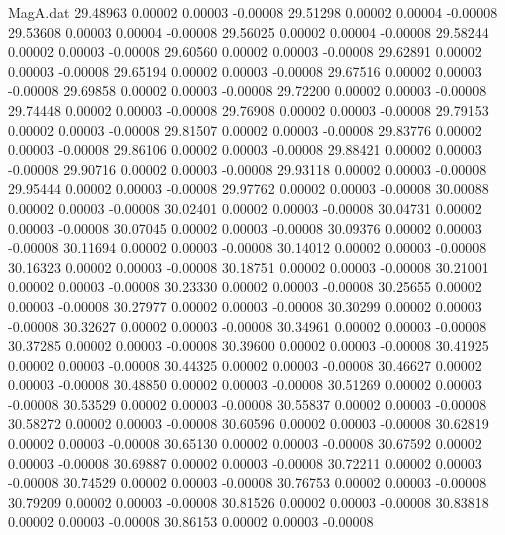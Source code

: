 \begin{filecontents}{MagA.dat}
  29.48963    0.00002    0.00003   -0.00008
  29.51298    0.00002    0.00004   -0.00008
  29.53608    0.00003    0.00004   -0.00008
  29.56025    0.00002    0.00004   -0.00008
  29.58244    0.00002    0.00003   -0.00008
  29.60560    0.00002    0.00003   -0.00008
  29.62891    0.00002    0.00003   -0.00008
  29.65194    0.00002    0.00003   -0.00008
  29.67516    0.00002    0.00003   -0.00008
  29.69858    0.00002    0.00003   -0.00008
  29.72200    0.00002    0.00003   -0.00008
  29.74448    0.00002    0.00003   -0.00008
  29.76908    0.00002    0.00003   -0.00008
  29.79153    0.00002    0.00003   -0.00008
  29.81507    0.00002    0.00003   -0.00008
  29.83776    0.00002    0.00003   -0.00008
  29.86106    0.00002    0.00003   -0.00008
  29.88421    0.00002    0.00003   -0.00008
  29.90716    0.00002    0.00003   -0.00008
  29.93118    0.00002    0.00003   -0.00008
  29.95444    0.00002    0.00003   -0.00008
  29.97762    0.00002    0.00003   -0.00008
  30.00088    0.00002    0.00003   -0.00008
  30.02401    0.00002    0.00003   -0.00008
  30.04731    0.00002    0.00003   -0.00008
  30.07045    0.00002    0.00003   -0.00008
  30.09376    0.00002    0.00003   -0.00008
  30.11694    0.00002    0.00003   -0.00008
  30.14012    0.00002    0.00003   -0.00008
  30.16323    0.00002    0.00003   -0.00008
  30.18751    0.00002    0.00003   -0.00008
  30.21001    0.00002    0.00003   -0.00008
  30.23330    0.00002    0.00003   -0.00008
  30.25655    0.00002    0.00003   -0.00008
  30.27977    0.00002    0.00003   -0.00008
  30.30299    0.00002    0.00003   -0.00008
  30.32627    0.00002    0.00003   -0.00008
  30.34961    0.00002    0.00003   -0.00008
  30.37285    0.00002    0.00003   -0.00008
  30.39600    0.00002    0.00003   -0.00008
  30.41925    0.00002    0.00003   -0.00008
  30.44325    0.00002    0.00003   -0.00008
  30.46627    0.00002    0.00003   -0.00008
  30.48850    0.00002    0.00003   -0.00008
  30.51269    0.00002    0.00003   -0.00008
  30.53529    0.00002    0.00003   -0.00008
  30.55837    0.00002    0.00003   -0.00008
  30.58272    0.00002    0.00003   -0.00008
  30.60596    0.00002    0.00003   -0.00008
  30.62819    0.00002    0.00003   -0.00008
  30.65130    0.00002    0.00003   -0.00008
  30.67592    0.00002    0.00003   -0.00008
  30.69887    0.00002    0.00003   -0.00008
  30.72211    0.00002    0.00003   -0.00008
  30.74529    0.00002    0.00003   -0.00008
  30.76753    0.00002    0.00003   -0.00008
  30.79209    0.00002    0.00003   -0.00008
  30.81526    0.00002    0.00003   -0.00008
  30.83818    0.00002    0.00003   -0.00008
  30.86153    0.00002    0.00003   -0.00008

\end{filecontents}
